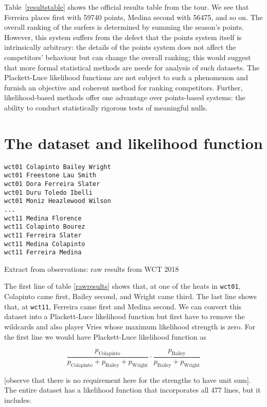 \documentclass{article}
\begin{document}
Table~\ref{resultstable} shows the official results table from the
tour.  We see that Ferreira places first with 59740 points, Medina
second with 56475, and so on.  The overall ranking of the surfers is
determined by summing the season's points.  However, this system
suffers from the defect that the points system itself is intrinsically
arbitrary: the details of the points system does not affect the
competitors' behaviour but can change the overall ranking; this would
suggest that more formal statistical methods are neede for analysis of
such datasets.  The Plackett-Luce likelihood functions are not subject
to such a phenomenon and furnish an objective and coherent method for
ranking competitors.  Further, likelihood-based methods offer one
advantage over points-based systems: the ability to conduct
statistically rigorous tests of meaningful nulls.

\section{The dataset and likelihood function}

\begin{table}
\begin{verbatim}
wct01 Colapinto Bailey Wright
wct01 Freestone Lau Smith
wct01 Dora Ferreira Slater
wct01 Duru Toledo Ibelli
wct01 Moniz Heazlewood Wilson
...
wct11 Medina Florence
wct11 Colapinto Bourez
wct11 Ferreira Slater
wct11 Medina Colapinto
wct11 Ferreira Medina
\end{verbatim}
\caption{Extract from observations: raw results\label{rawresults} from
  WCT 2018}
\end{table}

The first line of table \ref{rawresults} shows that, at one of the
heats in {\tt wct01}, Colapinto came first, Bailey second, and Wright
came third.  The last line shows that, at {\tt wct11}, Ferreira came
first and Medina second.  We can convert this dataset into a
Plackett-Luce likelihood function but first have to remove the
wildcards and also player Vries whose maximum likelihood strength is
zero.  For the first line we would have Plackett-Luce likelihood function as

\begin{equation}
\frac{p_\mathrm{Colapinto}}{p_\mathrm{Colapinto} + p_\mathrm{Bailey} + p_\mathrm{Wright}}\cdot
\frac{p_\mathrm{Bailey}}{p_\mathrm{Bailey} + p_\mathrm{Wright}}
\end{equation}

[observe that there is no requirement here for the strengths to have
unit sum].  The entire dataset has a likelihood function that
incorporates all 477 lines, but it includes:
\end{document}
